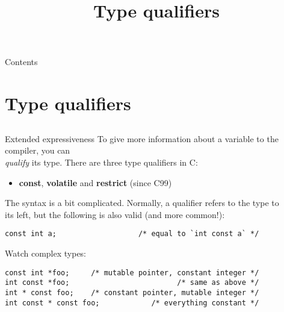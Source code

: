 
\newcommand{\topic}{
	Type qualifiers
}

\title{\topic}
\supertitle{\course}
\date{}



\maketitle

\begin{frame}{Contents}
	\tableofcontents
\end{frame}
\section{Type qualifiers}
\subsection{}

\begin{frame}[fragile = singleslide]{Extended expressiveness}
To give more information about a variable to the compiler, you can\\
\textit{qualify} its type. There are three type qualifiers in C:\\
\begin{itemize}
	\item \textbf{const}, \textbf{volatile} and \textbf{restrict} (since C99)
\end{itemize}
\bigskip
The syntax is a bit complicated. Normally, a qualifier refers to the type to\\
its left, but the following is also valid (and more common!):
\begin{lstlisting}
const int a;				   /* equal to `int const a` */
\end{lstlisting}
Watch complex types:
\begin{lstlisting}
const int *foo;		/* mutable pointer, constant integer */
int const *foo;							/* same as above */
int * const foo;	/* constant pointer, mutable integer */
int const * const foo; 			  /* everything constant */
\end{lstlisting}
\end{frame}

